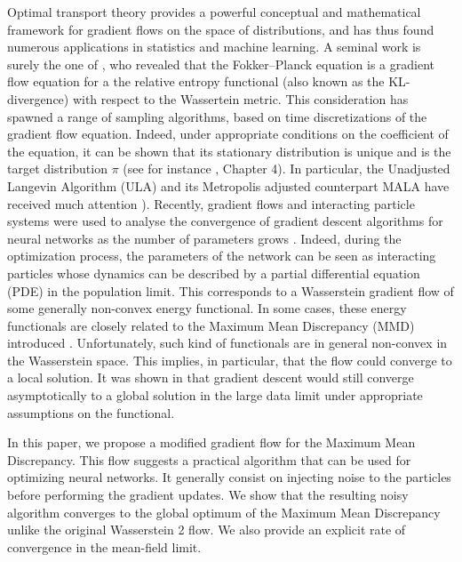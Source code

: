 Optimal transport   theory provides a powerful conceptual and mathematical framework for gradient flows on the space of distributions, and has thus found numerous applications in statistics and machine learning. A seminal work is surely the one of \cite{jordan1998variational}, who revealed that the Fokker–Planck equation is a gradient
flow equation for a the relative entropy functional (also known as the KL-divergence) with respect to the Wassertein metric. This consideration has spawned a range of sampling
algorithms, based on time discretizations of the gradient flow equation. Indeed, under appropriate conditions on the coefficient of the equation, it can be shown that its stationary distribution is unique and is the target distribution $\pi$ (see for instance \cite{pavliotis2011stochastic}, Chapter 4). In particular, the Unadjusted
Langevin Algorithm (ULA) and its Metropolis adjusted counterpart MALA have received much
attention \cite{durmus2018analysis,bernton2018langevin}). Recently, gradient flows and interacting particle systems were used to analyse the convergence of gradient descent algorithms for neural networks as the number of parameters grows \cite{chizat2018global,rotskoff2019global} . Indeed, during the optimization process, the parameters of the network can be seen as interacting particles whose dynamics can be described by a partial differential equation (PDE) in the population limit. This corresponds to a Wasserstein gradient flow of some generally non-convex energy functional. In some cases, these energy functionals are closely related to the Maximum Mean Discrepancy (MMD) introduced \cite{gretton2012kernel}. Unfortunately, such kind of functionals are in general non-convex in the Wasserstein space. This implies, in particular, that the flow could converge to a local solution.  It was shown in \cite{chizat2018global,rotskoff2019global} that gradient descent would still converge asymptotically to a global solution in the large data limit under appropriate assumptions on the functional. 

In this paper, we propose a modified gradient flow for the Maximum Mean Discrepancy. This flow suggests a practical algorithm that can be used for optimizing neural networks. It generally consist on injecting noise to the particles before performing the gradient updates. We show that the resulting noisy algorithm converges to the global optimum of the Maximum Mean Discrepancy unlike the original Wasserstein 2 flow. We also provide an explicit rate of convergence in the mean-field limit.  

